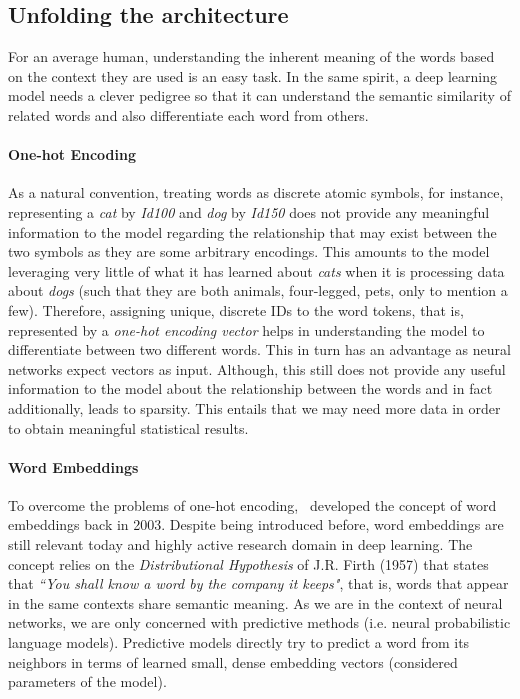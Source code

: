 \subsection{Unfolding the architecture}\label{section:architecture}

For an average human, understanding the inherent meaning of the words based on the context they are used is an easy task. In the same spirit, a deep learning model needs a clever pedigree so that it can understand the semantic similarity of related words and also differentiate each word from others. 


\paragraph{One-hot Encoding} As a natural convention, treating words as discrete atomic symbols, for instance, representing a \emph{cat} by \emph{Id100} and \emph{dog} by \emph{Id150} does not provide any meaningful information to the model regarding the relationship that may exist between the two symbols as they are some arbitrary encodings. This amounts to the model leveraging very little of what it has learned about \emph{cats} when it is processing data about \emph{dogs} (such that they are both animals, four-legged, pets, only to mention a few). Therefore, assigning unique, discrete IDs to the word tokens, that is, represented by a \emph{one-hot encoding vector} helps in understanding the model to differentiate between two different words. This in turn has an advantage as neural networks expect vectors as input. Although, this still does not provide any useful information to the model about the relationship between the words and in fact additionally, leads to sparsity. This entails that we may need more data in order to obtain meaningful statistical results. 


\paragraph{Word Embeddings} To overcome the problems of one-hot encoding,~\cite{bengio2003neural} developed the concept of word embeddings back in 2003. Despite being introduced before, word embeddings are still relevant today and highly active research domain in deep learning. The concept relies on the \emph{Distributional Hypothesis} of J.R. Firth (1957) that states that \emph{``You shall know a word by the company it keeps"}, that is, words that appear in the same contexts share semantic meaning. As we are in the context of neural networks, we are only concerned with predictive methods (i.e. neural probabilistic language models). Predictive models directly try to predict a word from its neighbors in terms of learned small, dense embedding vectors (considered parameters of the model).



